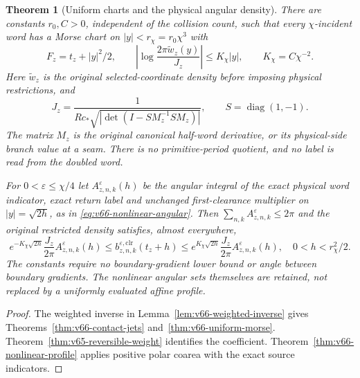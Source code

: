 \documentclass[11pt,reqno]{amsart}
\numberwithin{equation}{section}
\newtheorem{leadtheorem}{Theorem}
\theoremstyle{definition}\newtheorem{definition}[theorem]{Definition}
\theoremstyle{remark}\newtheorem{remark}[theorem]{Remark}
\begin{document}
\begin{leadtheorem}[Uniform charts and the physical angular density]
\label{thm:intro-v66-profile}
There are constants $r_0,C>0$, independent of the collision count,
such that every $\chi$-incident word has a Morse chart on
$|y|<r_\chi=r_0\chi^3$ with
\[
 F_z=t_z+|y|^2/2,\qquad
 \left|\log\frac{2\pi\widetilde w_z(y)}{J_z}\right|
          \le K_\chi|y|,\qquad K_\chi=C\chi^{-2}.
\]
Here $\widetilde w_z$ is the original selected-coordinate density
before imposing physical restrictions, and
\[
 J_z=\frac{1}{R c_*\sqrt{|\det(I-SM_z^{-1}SM_z)|}},
       \qquad S=\operatorname{diag}(1,-1).
\]
The matrix $M_z$ is the original canonical half-word derivative,
or its physical-side branch value at a seam. There is no primitive-period
quotient, and no label is read from the doubled word.

For $0<\varepsilon\le\chi/4$ let
$A_{z,n,k}^{\varepsilon}(h)$ be the angular integral of the exact
physical word indicator, exact return label and unchanged first-clearance
multiplier on $|y|=\sqrt{2h}$, as in
\eqref{eq:v66-nonlinear-angular}. Then $\sum_{n,k}A_{z,n,k}^{\varepsilon}\le2\pi$
and the original restricted density satisfies, almost everywhere,
\[
 e^{-K_\chi\sqrt{2h}}\frac{J_z}{2\pi}A_{z,n,k}^{\varepsilon}(h)
 \le b_{z,n,k}^{\varepsilon,\mathrm{clr}}(t_z+h)
 \le e^{K_\chi\sqrt{2h}}\frac{J_z}{2\pi}A_{z,n,k}^{\varepsilon}(h),
 \quad 0<h<r_\chi^2/2.
\]
The constants require no boundary-gradient lower bound or angle between
boundary gradients. The nonlinear angular sets themselves are retained,
not replaced by a uniformly evaluated affine profile.
\end{leadtheorem}
\begin{proof}
The weighted inverse in Lemma~\ref{lem:v66-weighted-inverse} gives
Theorems~\ref{thm:v66-contact-jets} and~\ref{thm:v66-uniform-morse}.
Theorem~\ref{thm:v65-reversible-weight} identifies the coefficient.
Theorem~\ref{thm:v66-nonlinear-profile} applies positive polar coarea
with the exact source indicators.
\end{proof}
\end{document}
